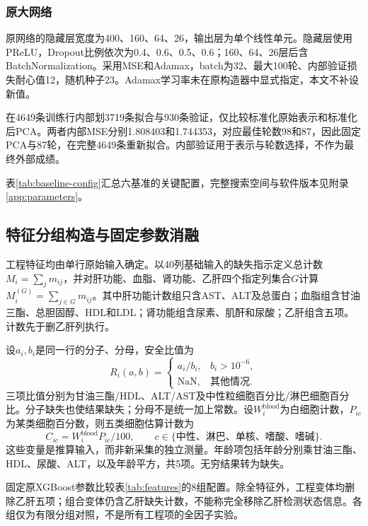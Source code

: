 \subsubsection{原大网络}
原网络的隐藏层宽度为400、160、64、26，输出层为单个线性单元。隐藏层使用PReLU，Dropout比例依次为0.4、0.6、0.5、0.6；160、64、26层后含BatchNormalization。采用MSE和Adamax，batch为32、最大100轮、内部验证损失耐心值12，随机种子23。Adamax学习率未在原构造器中显式指定，本文不补设新值。

在4649条训练行内部划3719条拟合与930条验证，仅比较标准化原始表示和标准化后PCA。两者内部MSE分别1.808403和1.744353，对应最佳轮数98和87，因此固定PCA与87轮，在完整4649条重新拟合。内部验证用于表示与轮数选择，不作为最终外部成绩。

表\ref{tab:baseline-config}汇总六基准的关键配置，完整搜索空间与软件版本见附录\ref{app:parameters}。


\subsection{特征分组构造与固定参数消融}
工程特征均由单行原始输入确定。以40列基础输入的缺失指示定义总计数$M_i=\sum_jm_{ij}$，并对肝功能、血脂、肾功能、乙肝四个指定列集合$G$计算$M_i^{(G)}=\sum_{j\in G}m_{ij}$。其中肝功能计数组只含AST、ALT及总蛋白；血脂组含甘油三酯、总胆固醇、HDL和LDL；肾功能组含尿素、肌酐和尿酸；乙肝组含五项。计数先于删乙肝列执行。

设$a_i,b_i$是同一行的分子、分母，安全比值为
\begin{equation}
R_i(a,b)=\begin{cases}a_i/b_i,&b_i>10^{-6},\\\mathrm{NaN},&\text{其他情况}.
\end{cases}
\label{eq:ratio}
\end{equation}
三项比值分别为甘油三酯/HDL、ALT/AST及中性粒细胞百分比/淋巴细胞百分比。分子缺失也使结果缺失；分母不是统一加上常数。设$W_i^{\mathrm{blood}}$为白细胞计数，$P_{ic}$为某类细胞百分数，则五类细胞估算计数为
\begin{equation}
C_{ic}=W_i^{\mathrm{blood}}P_{ic}/100,
\qquad c\in\{\text{中性、淋巴、单核、嗜酸、嗜碱}\}.
\label{eq:counts}
\end{equation}
这些变量是推算输入，而非新采集的独立测量。年龄项包括年龄分别乘甘油三酯、HDL、尿酸、ALT，以及年龄平方，共5项。无穷结果转为缺失。

固定原XGBoost参数比较表\ref{tab:features}的8组配置。除全特征外，工程变体均删除乙肝五项；组合变体仍含乙肝缺失计数，不能称完全移除乙肝检测状态信息。各组仅为有限分组对照，不是所有工程项的全因子实验。


